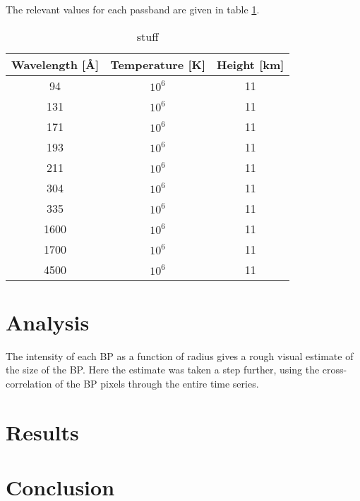 \documentclass[preprint2]{aastex}
\begin{document}
The relevant values for each passband are given in table \ref{aia}.
\begin{table}[h]
\centering
    \begin{tabular}{c c c}
        \hline\hline
        Wavelength [\AA{}] & Temperature [K] & Height [km]\\
        \hline
        94 & $10^{6}$ & 11\\
        131 & $10^{6}$ & 11\\
        171 & $10^{6}$ & 11\\
        193 & $10^{6}$ & 11\\
        211 & $10^{6}$ & 11\\
        304 & $10^{6}$ & 11\\
        335 & $10^{6}$ & 11\\
        1600 & $10^{6}$ & 11\\
        1700 & $10^{6}$ & 11\\
        4500 & $10^{6}$ & 11\\
    \end{tabular}
\caption{stuff}
\label{aia}
\end{table}

\section{Analysis}\label{analysis}
The intensity of each BP as a function of radius gives a rough visual estimate
of the size of the BP. Here the estimate was taken a step further, using the
cross-correlation of the BP pixels through the entire time series.

\section{Results}\label{results}
\section{Conclusion}\label{conclusion}


\end{document}
